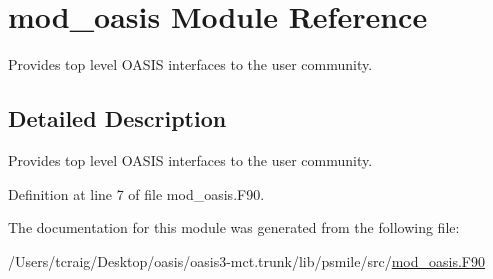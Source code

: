 \hypertarget{classmod__oasis}{\section{mod\+\_\+oasis Module Reference}
\label{classmod__oasis}
}


Provides top level O\+A\+S\+I\+S interfaces to the user community.  




\subsection{Detailed Description}
Provides top level O\+A\+S\+I\+S interfaces to the user community. 

Definition at line 7 of file mod\+\_\+oasis.\+F90.



The documentation for this module was generated from the following file\+:\begin{DoxyCompactItemize}
\item 
/\+Users/tcraig/\+Desktop/oasis/oasis3-\/mct.\+trunk/lib/psmile/src/\hyperlink{mod__oasis_8_f90}{mod\+\_\+oasis.\+F90}\end{DoxyCompactItemize}
